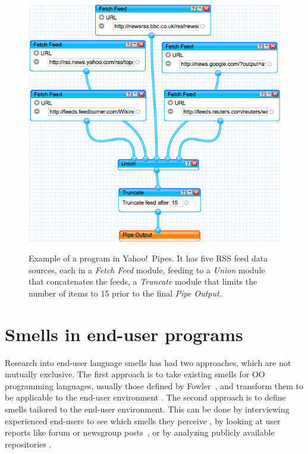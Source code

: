 \documentclass{sig-alternate}
\begin{document}
\begin{figure}
\caption{Example of a program in Yahoo!\ Pipes. It has five RSS feed data sources, each in a \emph{Fetch Feed} module, feeding to a \emph{Union} module that concatenates the feeds, a \emph{Truncate} module that limits the number of items to 15 prior to the final \emph{Pipe Output}. }
\centering
\includegraphics[width=\columnwidth]{img/yp-1}
\label{fig:ypexample}
\end{figure}


\section{Smells in end-user programs}
\label{sec:smells}
Research into end-user language smells has had two approaches, which are not mutually exclusive.
The first approach is to take existing smells for OO programming languages, usually those defined by Fowler~\cite{Fowl1999}, and transform them to be applicable to the end-user environment \cite{Hermans2012inter,Hermans2012intra,Stolee2011,StoleeTSE2013, chambers2013smell}.
The second approach is to define smells tailored to the end-user environment.
This can be done by interviewing experienced end-users to see which smells they perceive \cite{chambers2013smell}, by looking at user reports like forum or newsgroup posts~\cite{badame2012refactoring,chambers2013smell}, or by analyzing publicly available repositories \cite{Stolee2011,StoleeTSE2013,Hermans2012intra}.
\end{document}
